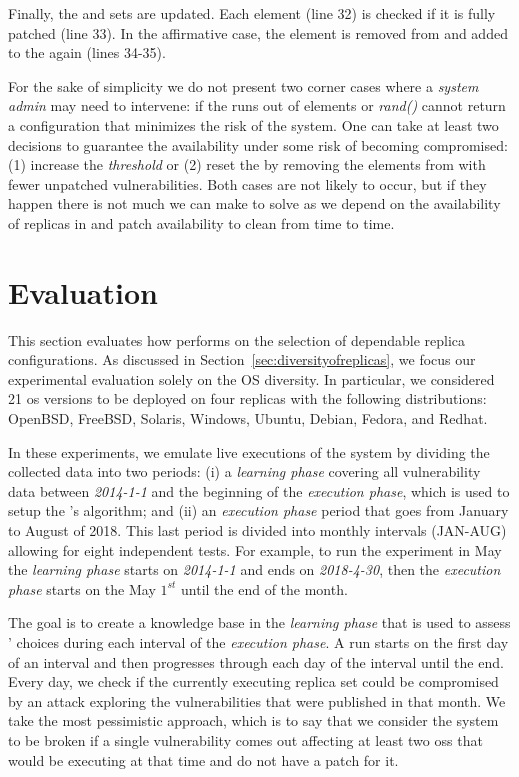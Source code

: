 Finally, the \RS and \QS sets are updated. 
Each \QS element (line 32) is checked if it is fully patched (line 33).
In the affirmative case, the element is removed from \QS and added to the \RS again (lines 34-35).


For the sake of simplicity we do not present two corner cases where a \emph{system admin} may need to intervene: if the \RS runs out of elements or \emph{rand()} cannot return a configuration that minimizes the risk of the system.
One can take at least two decisions to guarantee the availability under some risk of becoming compromised: (1) increase the \emph{threshold} or (2) reset the \RS by removing the elements from \QS with fewer unpatched vulnerabilities.
Both cases are not likely to occur, but if they happen there is not much we can make to solve as we depend on the availability of replicas in \RS and patch availability to clean \QS from time to time. 

\section{Evaluation}
\label{sec:diversity}


This section evaluates how \system performs on the selection of dependable replica configurations.
As discussed in Section~\ref{sec:diversityofreplicas}, we focus our experimental evaluation solely on the OS diversity.
In particular, we considered 21 \gls{os} versions to be deployed on four replicas with the following distributions: OpenBSD, FreeBSD, Solaris, Windows, Ubuntu, Debian, Fedora, and Redhat. 

In these experiments, we emulate live executions of the system by dividing the collected data into two periods:
(i) a \emph{learning phase} covering all vulnerability data between \emph{2014-1-1} and the beginning of the \emph{execution phase}, which is used to setup the \risk's algorithm; 
and (ii) an \emph{execution phase} period that goes from January to August of 2018. 
This last period is divided into monthly intervals (JAN-AUG) allowing for eight independent tests.
For example, to run the experiment in May the \emph{learning phase} starts on \emph{2014-1-1} and ends on \emph{2018-4-30}, then the \emph{execution phase} starts on the May $1^{st}$ until the end of the month. 

The goal is to create a knowledge base in the \emph{learning phase} that is used to assess \system' choices during each interval of the \emph{execution phase}. 
A run starts on the first day of an interval and then progresses through each day of the interval until the end. 
Every day, we check if the currently executing replica set could be compromised by an attack exploring the vulnerabilities that were published in that month. 
We take the most pessimistic approach, which is to say that we consider the system to be broken if a single vulnerability comes out affecting at least two \glspl{os} that would be executing at that time and do not have a patch for it.


